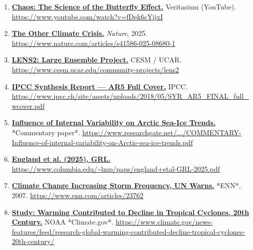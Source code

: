 \documentclass[
  10pt,
  a4paper,
  DIV=11,
  numbers=noendperiod,
  open=any]{scrreprt}
\numberwithin{equation}{chapter}
\numberwithin{equation}{section}
\renewcommand{\[}{\begin{equation}}
\renewcommand{\]}{\end{equation}}
\begin{document}
\begin{enumerate}


  \item \label{ref:web0}\href{https://www.youtube.com/watch?v=fDek6cYijxI}{\textbf{Chaos: The Science of the Butterfly Effect.}} Veritasium (YouTube).  
  \url{https://www.youtube.com/watch?v=fDek6cYijxI}

  \item \label{ref:web1}\href{https://www.nature.com/articles/s41586-025-08680-1}{\textbf{The Other Climate Crisis.}} \textit{Nature}, 2025.  
  \url{https://www.nature.com/articles/s41586-025-08680-1}

  \item \label{ref:web2}\href{https://www.cesm.ucar.edu/community-projects/lens2}{\textbf{LENS2: Large Ensemble Project.}} CESM / UCAR.  
  \url{https://www.cesm.ucar.edu/community-projects/lens2}

  \item \label{ref:web3}\href{https://www.ipcc.ch/site/assets/uploads/2018/05/SYR_AR5_FINAL_full_wcover.pdf}{\textbf{IPCC Synthesis Report — AR5 Full Cover.}} IPCC.  
  \url{https://www.ipcc.ch/site/assets/uploads/2018/05/SYR_AR5_FINAL_full_wcover.pdf}

  \item \label{ref:web4}\href{https://www.researchgate.net/profile/Jennifer-Kay-7/publication/276333917_COMMENTARY_Influence_of_internal_variability_on_Arctic_sea-ice_trends/links/5d6738cc299bf11adf298934/COMMENTARY-Influence-of-internal-variability-on-Arctic-sea-ice-trends.pdf}{\textbf{Influence of Internal Variability on Arctic Sea-Ice Trends.}} *Commentary paper*.  
  \url{https://www.researchgate.net/.../COMMENTARY-Influence-of-internal-variability-on-Arctic-sea-ice-trends.pdf}

  \item \label{ref:web5}\href{https://www.columbia.edu/\string~lmp/paps/england\%2Betal-GRL-2025.pdf}{\textbf{England et al. (2025), GRL.}}  
  \url{https://www.columbia.edu/~lmp/paps/england+etal-GRL-2025.pdf}

  \item \label{ref:web6}\href{https://www.enn.com/articles/23762}{\textbf{Climate Change Increasing Storm Frequency, UN Warns.}} *ENN*, 2007.  
  \url{https://www.enn.com/articles/23762}

  \item \label{ref:web7}\href{https://www.climate.gov/news-features/feed/research-global-warming-contributed-decline-tropical-cyclones-20th-century/}{\textbf{Study: Warming Contributed to Decline in Tropical Cyclones, 20th Century.}} NOAA *Climate.gov*.  
  \url{https://www.climate.gov/news-features/feed/research-global-warming-contributed-decline-tropical-cyclones-20th-century/}


\end{enumerate}
\end{document}

